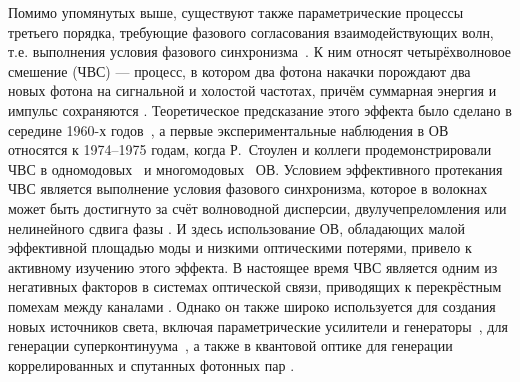 Помимо упомянутых выше, существуют также параметрические процессы третьего порядка, требующие фазового согласования взаимодействующих волн, т.е. выполнения условия фазового синхронизма~\cite{agrawal2019}. К ним относят четырёхволновое смешение (ЧВС) — процесс, в котором два фотона накачки порождают два новых фотона на сигнальной и холостой частотах, причём суммарная энергия и импульс сохраняются \cite{stolen1975phase}. Теоретическое предсказание этого эффекта было сделано в середине 1960-х годов~\cite{armstrong1962interactions}, а первые экспериментальные наблюдения в ОВ относятся к 1974–1975 годам, когда Р.~Стоулен и коллеги продемонстрировали ЧВС в одномодовых~\cite{stolen1975phase} и многомодовых~\cite{stolen1974phase} ОВ. Условием эффективного протекания ЧВС является выполнение условия фазового синхронизма, которое в волокнах может быть достигнуто за счёт волноводной дисперсии, двулучепреломления или нелинейного сдвига фазы \cite{agrawal2019}. И здесь использование ОВ, обладающих малой эффективной площадью моды и низкими оптическими потерями, привело к активному изучению этого эффекта. В настоящее время ЧВС является одним из негативных факторов в системах оптической связи, приводящих к перекрёстным помехам между каналами \cite{chraplyvy1990limitations}. Однако он также широко используется для создания новых источников света, включая параметрические усилители и генераторы~\cite{marhic1996broadband}, для генерации суперконтинуума~\cite{dudley2006supercontinuum}, а также в квантовой оптике для генерации коррелированных и спутанных фотонных пар \cite{sharping2001four}.
